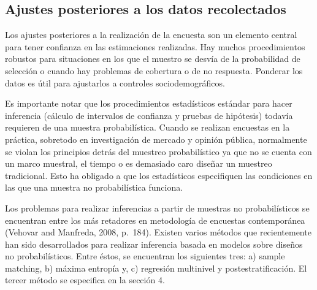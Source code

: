 \documentclass[]{article}
\begin{document}
\subsection{Ajustes posteriores a los datos
recolectados}\label{ajustes-posteriores-a-los-datos-recolectados}

Los ajustes posteriores a la realización de la encuesta son un elemento
central para tener confianza en las estimaciones realizadas. Hay muchos
procedimientos robustos para situaciones en los que el muestro se desvía
de la probabilidad de selección o cuando hay problemas de cobertura o de
no respuesta. Ponderar los datos es útil para ajustarlos a controles
sociodemográficos.

Es importante notar que los procedimientos estadísticos estándar para
hacer inferencia (cálculo de intervalos de confianza y pruebas de
hipótesis) todavía requieren de una muestra probabilística. Cuando se
realizan encuestas en la práctica, sobretodo en investigación de mercado
y opinión pública, normalmente se violan los principios detrás del
muestreo probabilístico ya que no se cuenta con un marco muestral, el
tiempo o es demasiado caro diseñar un muestreo tradicional. Esto ha
obligado a que los estadísticos especifiquen las condiciones en las que
una muestra no probabilística funciona.

Los problemas para realizar inferencias a partir de muestras no
probabilísticos se encuentran entre los más retadores en metodología de
encuestas contemporánea (Vehovar and Manfreda, 2008, p.~184). Existen
varios métodos que recientemente han sido desarrollados para realizar
inferencia basada en modelos sobre diseños no probabilísticos. Entre
éstos, se encuentran los siguientes tres: a) sample matching, b) máxima
entropía y, c) regresión multinivel y postestratificación. El tercer
método se especifica en la sección 4.
\end{document}
